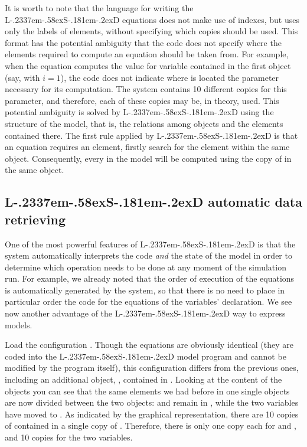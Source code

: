 \documentclass [11pt,a4paper] {book}
\def\LsD{{L\kern-.2337em\lower-.58ex\hbox{S}\kern-.181em\lower-.2ex\hbox{D}}\xspace}
\begin{document}
It is worth to note that the language for writing the \LsD equations does not make use of indexes, but uses only the labels of elements, without specifying which copies should be used. This format has the potential ambiguity that the code does not specify where the elements required to compute an equation should be taken from. For example, when the equation computes the value for variable  contained in the first object (say, with $i=1$), the code does not indicate where is located the parameter  necessary for its computation. The system contains 10 different copies for this parameter, and therefore, each of these copies may be, in theory, used. This potential ambiguity is solved by \LsD using the structure of the model, that is, the relations among objects and the elements contained there. The first rule applied by \LsD is that an equation requires an element, firstly search for the element within the same object. Consequently, every  in the model will be computed using the copy of  in the same object.

\subsection{\LsD automatic data retrieving}
One of the most powerful features of \LsD is that the system automatically interprets the code \textit{and} the state of the model in order to determine which operation needs to be done at any moment of the simulation run. For example, we already noted that the order of execution of the equations is automatically generated by the system, so that there is no need to place in particular order the code for the equations of the variables' declaration. We see now another advantage of the \LsD way to express models.

Load the configuration . Though the equations are obviously identical (they are coded into the \LsD model program and cannot be modified by the program itself), this configuration differs from the previous ones, including an additional object, , contained in . Looking at the content of the objects you can see that the same elements we had before in one single objects are now divided between the two objects:   and  remain in , while the two variables have moved to . As indicated by the graphical representation, there are 10 copies of  contained in a single copy of . Therefore, there is only one copy each for  and , and 10 copies for the two variables.
\end{document}

